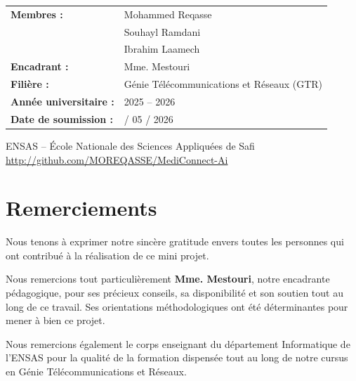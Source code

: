 \documentclass[12pt,a4paper]{article}
\begin{document}
\begin{titlepage}
\begin{tcolorbox}[
  colback=lightgray,
  colframe=primaryblue,
  width=0.88\linewidth,
  title={\bfseries Équipe Projet},
  fonttitle=\color{white},
  attach boxed title to top left={yshift=-2mm, xshift=4mm},
  boxed title style={colback=primaryblue}
]
\begin{tabular}{ll}
\textbf{Membres :} & Mohammed Reqasse \\
                   & Souhayl Ramdani \\
                   & Ibrahim Laamech \\[4pt]
\textbf{Encadrant :} & Mme. Mestouri \\[4pt]
\textbf{Filière :} & Génie Télécommunications et Réseaux (GTR) \\[4pt]
\textbf{Année universitaire :} & 2025 -- 2026 \\[4pt]
\textbf{Date de soumission :} & \quad 08 / 05 / 2026
\end{tabular}
\end{tcolorbox}

\vfill
{\small\color{gray} ENSAS -- École Nationale des Sciences Appliquées de Safi}\\[0.3cm]
{\tiny\url{http://github.com/MOREQASSE/MediConnect-Ai}}
\end{titlepage}

\thispagestyle{fancy}

\newpage
\section*{Remerciements}

Nous tenons à exprimer notre sincère gratitude envers toutes les personnes qui ont contribué à la réalisation de ce mini projet.

Nous remercions tout particulièrement \textbf{Mme. Mestouri}, notre encadrante pédagogique, pour ses précieux conseils, sa disponibilité et son soutien tout au long de ce travail. Ses orientations méthodologiques ont été déterminantes pour mener à bien ce projet.

Nous remercions également le corps enseignant du département Informatique de l'ENSAS pour la qualité de la formation dispensée tout au long de notre cursus en Génie Télécommunications et Réseaux.
\end{document}
